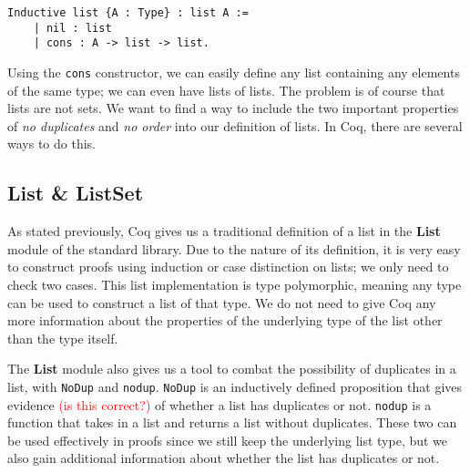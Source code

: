 \begin{minipage}{\linewidth}
\begin{lstlisting}[language=Coq, label={lst:list_def}, caption={Inductive def. of list type in Coq}]
Inductive list {A : Type} : list A :=
    | nil : list
    | cons : A -> list -> list.
\end{lstlisting}
\end{minipage}

Using the \lstinline{cons} constructor, we can easily define any list containing any elements of the same type;
we can even have lists of lists.
The problem is of course that lists are not sets. We want to find a way to include the two important properties
of \textit{no duplicates} and \textit{no order} into our definition of lists.
In Coq, there are several ways to do this.


\subsection{List \& ListSet}

As stated previously, Coq gives us a traditional definition of a list in the \textbf{List} module of the standard library.
Due to the nature of its definition, it is very easy to construct proofs using induction or case distinction on lists;
we only need to check two cases.
This list implementation is type polymorphic, meaning any type can be used to construct a list of that type.
We do not need to give Coq any more information about the properties of the underlying type of the list other than the type itself.

The \textbf{List} module also gives us a tool to combat the possibility of duplicates in a list,
with \lstinline{NoDup} and \lstinline{nodup}.
\lstinline{NoDup} is an inductively defined proposition that gives evidence \textcolor{red}{(is this correct?)}
of whether a list has duplicates or not.
\lstinline{nodup} is a function that takes in a list and returns a list without duplicates.
These two can be used effectively in proofs since we still keep the underlying list type,
but we also gain additional information about whether the list has duplicates or not.

